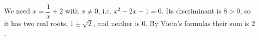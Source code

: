 We need $x=\dfrac{1}{x}+2$ with $x\ne0$, i.e. $x^2-2x-1=0$. Its discriminant is $8>0$, so it has two real roots, $1\pm\sqrt2$, and neither is $0$. By Vieta's formulas their sum is $\boxed{2}$.
